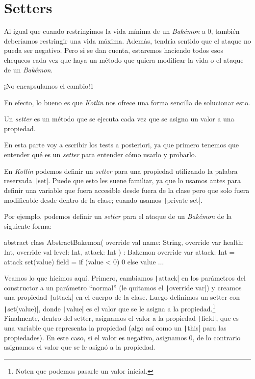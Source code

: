 \section{Setters}
  \label{sec:setters}

  Al igual que cuando restringimos la vida mínima de un \textit{Bakémon} a 0, también deberíamos
  restringir una vida máxima.
  Además, tendría sentido que el ataque no pueda ser negativo.
  Pero si se dan cuenta, estaremos haciendo todos esos chequeos cada vez que haya un método que
  quiera modificar la vida o el ataque de un \textit{Bakémon}.

  \begin{center}
    ¡No encapsulamos el cambio!1
  \end{center}

  En efecto, lo bueno es que \textit{Kotlin} nos ofrece una forma sencilla de solucionar esto.

  \begin{defaultbox}[Setter]
    Un \textit{setter} es un método que se ejecuta cada vez que se asigna un valor a una propiedad.
  \end{defaultbox}

  En esta parte voy a escribir los tests a posteriori, ya que primero tenemos que entender qué es un
  \textit{setter} para entender cómo usarlo y probarlo.

  En \textit{Kotlin} podemos definir un \textit{setter} para una propiedad utilizando la palabra
  reservada \texttt|set|.
  Puede que esto les suene familiar, ya que lo usamos antes para definir una variable que fuera
  accesible desde fuera de la clase pero que solo fuera modificable desde dentro de la clase; cuando
  usamos \texttt|private set|.
  
  Por ejemplo, podemos definir un \textit{setter} para el ataque de un \textit{Bakémon} de la
  siguiente forma:

  \begin{kotlin}
    abstract class AbstractBakemon(
      override val name: String,
      override var health: Int,
      override val level: Int,
      attack: Int
    ) : Bakemon {
      override var attack: Int = attack
        set(value) {
          field = if (value < 0) 0 else value
        }
        ...
    }
  \end{kotlin}

  Veamos lo que hicimos aquí.
  Primero, cambiamos \texttt|attack| en los parámetros del constructor a un parámetro
  \enquote{normal} (le quitamos el \texttt|override var|) y creamos una propiedad
  \texttt|attack| en el cuerpo de la clase.
  Luego definimos un setter con \texttt|set(value)|, donde \texttt|value|
  es el valor que se le asigna a la propiedad.\footnote{Noten que podemos pasarle un valor inicial.}
  Finalmente, dentro del setter, asignamos el valor a la propiedad \texttt|field|, que
  es una variable que representa la propiedad (algo así como un \texttt|this| para las
  propiedades).
  En este caso, si el valor es negativo, asignamos 0, de lo contrario asignamos el valor que se
  le asignó a la propiedad.

